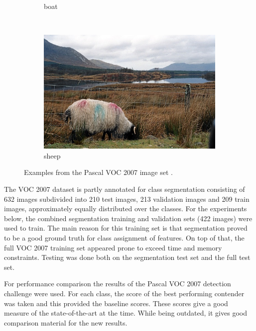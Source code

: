 \begin{figure}[bt]
\begin{subfigure}[b]{0.18\textwidth}
        \caption{\scriptsize boat}
        \label{fig:voc13}
    \end{subfigure}
    ~
    \begin{subfigure}[b]{0.18\textwidth}
        \centering
        \includegraphics[width=\textwidth]{000062}
        \caption{\scriptsize sheep}
        \label{fig:voc14}
    \end{subfigure}
    \caption{Examples from the Pascal VOC 2007 image set     \cite{pascal-voc-2007}.}
    \label{fig:pascalvoc07}
\end{figure}

The VOC 2007 dataset is partly annotated for class segmentation consisting of 632 images subdivided into 210 test images, 213 validation images and 209 train images, approximately equally distributed over the classes. For the experiments below, the combined segmentation training and validation sets (422 images) were used to train. The main reason for this training set is that segmentation proved to be a good ground truth for class assignment of features. On top of that, the full VOC 2007 training set appeared prone to exceed time and memory constraints. Testing was done both on the segmentation test set and the full test set.

For performance comparison the results of the Pascal VOC 2007 detection challenge were used. For each class, the score of the best performing contender was taken and this provided the baseline scores. These scores give a good measure of the state-of-the-art at the time. While being outdated, it gives good comparison material for the new results.


